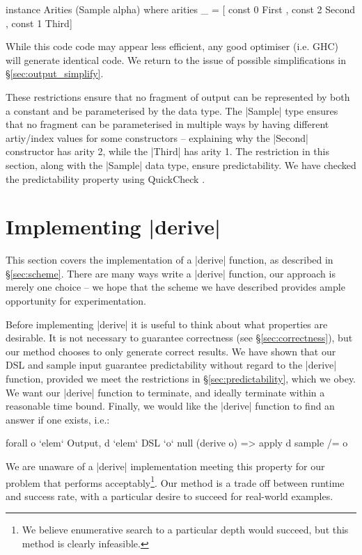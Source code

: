 \documentclass[preprint,draft]{sigplanconf}
\begin{document}
\begin{code}
instance Arities (Sample alpha) where
    arities _ =  [  const 0 First{}
                 ,  const 2 Second{}
                 ,  const 1 Third{}]
\end{code}

While this code code may appear less efficient, any good optimiser (i.e. GHC) will generate identical code. We return to the issue of possible simplifications in \S\ref{sec:output_simplify}.

These restrictions ensure that no fragment of output can be represented by both a constant and be parameterised by the data type. The |Sample| type ensures that no fragment can be parameterised in multiple ways by having different artiy/index values for some constructors -- explaining why the |Second| constructor has arity 2, while the |Third| has arity 1. The restriction in this section, along with the |Sample| data type, ensure predictability. We have checked the predictability property using QuickCheck \cite{quickcheck}.

\section{Implementing |derive|}
\label{sec:guess}

This section covers the implementation of a |derive| function, as described in \S\ref{sec:scheme}. There are many ways write a |derive| function, our approach is merely one choice -- we hope that the scheme we have described provides ample opportunity for experimentation.

Before implementing |derive| it is useful to think about what properties are desirable. It is not necessary to guarantee correctness (see \S\ref{sec:correctness}), but our method chooses to only generate correct results. We have shown that our DSL and sample input guarantee predictability without regard to the |derive| function, provided we meet the restrictions in \S\ref{sec:predictability}, which we obey. We want our |derive| function to terminate, and ideally terminate within a reasonable time bound. Finally, we would like the |derive| function to find an answer if one exists, i.e.:

\ignore\begin{code}
forall o `elem` Output, d `elem` DSL `o` null (derive o) => apply d sample /= o
\end{code}

We are unaware of a |derive| implementation meeting this property for our problem that performs acceptably\footnote{We believe enumerative search to a particular depth would succeed, but this method is clearly infeasible.}. Our method is a trade off between runtime and success rate, with a particular desire to succeed for real-world examples.
\end{document}
